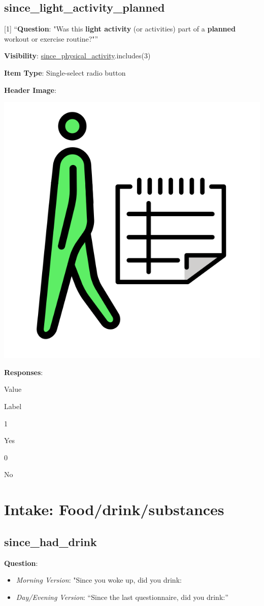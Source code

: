 \documentclass[]{book}
\providecommand{\tightlist}{%
  \setlength{\itemsep}{0pt}\setlength{\parskip}{0pt}}
\begin{document}
\hypertarget{since_light_activity_planned}{%
\section{since\_light\_activity\_planned}\label{since_light_activity_planned}}

{[}1{]} ``\textbf{Question}: "Was this \textbf{light activity} (or activities) part of a \textbf{planned} workout or exercise routine?"''

\textbf{Visibility}: \protect\hyperlink{since_physical_activity}{since\_physical\_activity}.includes(3)

\textbf{Item Type}: Single-select radio button

\textbf{Header Image}:

\begin{flushleft}\includegraphics[width=0.33\linewidth]{downloadFigs4latex_NIMH_Applet_Codebook/since_light_activity_planned_headerImg} \end{flushleft}

\textbf{Responses}:

Value

Label

1

Yes

0

No

\hypertarget{intake_section}{%
\chapter{Intake: Food/drink/substances}\label{intake_section}}

\hypertarget{since_had_drink}{%
\section{since\_had\_drink}\label{since_had_drink}}

\textbf{Question}:

\begin{itemize}
\tightlist
\item
  \emph{Morning Version}: "Since you woke up, did you drink:
\item
  \emph{Day/Evening Version}: ``Since the last questionnaire, did you drink:''
\end{itemize}
\end{document}

